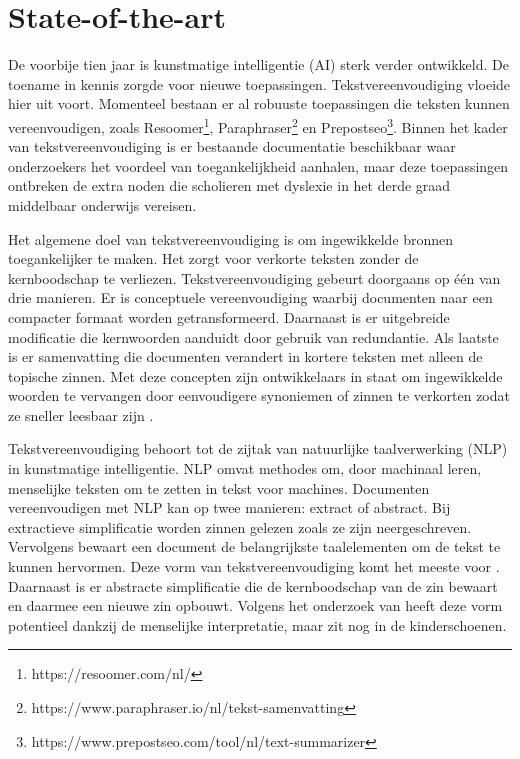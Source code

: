 

\section{State-of-the-art}%
\label{sec:state-of-the-art}

De voorbije tien jaar is kunstmatige intelligentie (AI) sterk verder ontwikkeld. De toename in kennis zorgde voor nieuwe toepassingen. Tekstvereenvoudiging vloeide hier uit voort. Momenteel bestaan er al robuuste toepassingen die teksten kunnen vereenvoudigen, zoals Resoomer\footnote{https://resoomer.com/nl/}, Paraphraser\footnote{https://www.paraphraser.io/nl/tekst-samenvatting} en Prepostseo\footnote{https://www.prepostseo.com/tool/nl/text-summarizer}. Binnen het kader van tekstvereenvoudiging is er bestaande documentatie beschikbaar waar onderzoekers het voordeel van toegankelijkheid aanhalen, maar deze toepassingen ontbreken de extra noden die scholieren met dyslexie in het derde graad middelbaar onderwijs vereisen.

Het algemene doel van tekstvereenvoudiging is om ingewikkelde bronnen toegankelijker te maken. Het zorgt voor verkorte teksten zonder de kernboodschap te verliezen. Tekstvereenvoudiging gebeurt doorgaans op één van drie manieren. Er is conceptuele vereenvoudiging waarbij documenten naar een compacter formaat worden getransformeerd. Daarnaast is er uitgebreide modificatie die kernwoorden aanduidt door gebruik van redundantie. Als laatste is er samenvatting die documenten verandert in kortere teksten met alleen de topische zinnen. Met deze concepten zijn ontwikkelaars in staat om ingewikkelde woorden te vervangen door eenvoudigere synoniemen of zinnen te verkorten zodat ze sneller leesbaar zijn \autocite{Siddharthan2014}.

Tekstvereenvoudiging behoort tot de zijtak van natuurlijke taalverwerking (NLP) in kunstmatige intelligentie. NLP omvat methodes om, door machinaal leren, menselijke teksten om te zetten in tekst voor machines. Documenten vereenvoudigen met NLP kan op twee manieren: extract of abstract. Bij extractieve simplificatie worden zinnen gelezen zoals ze zijn neergeschreven. Vervolgens bewaart een document de belangrijkste taalelementen om de tekst te kunnen hervormen. Deze vorm van tekstvereenvoudiging komt het meeste voor \autocite{Sciforce2020}. Daarnaast is er abstracte simplificatie die de kernboodschap van de zin bewaart en daarmee een nieuwe zin opbouwt. Volgens het onderzoek van \textcite{Chowdhary2020} heeft deze vorm potentieel dankzij de menselijke interpretatie, maar zit nog in de kinderschoenen.

